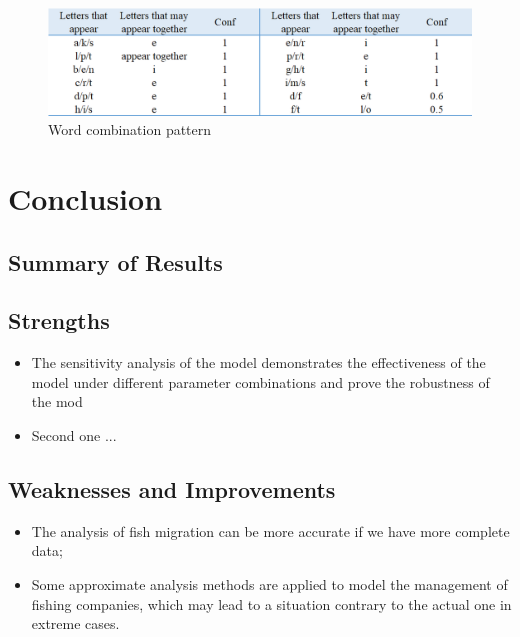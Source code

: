 \documentclass[12pt]{ctexart}
\begin{document}
\begin{figure}[htbp]
	\includegraphics[height=8\baselineskip, width=\textwidth]{1706065292593(1).jpg}
	\caption{Word combination pattern}
	\label{fg:10}
\end{figure}
  
  
  

  

\section{Conclusion}
\subsection{Summary of Results}

\subsection{Strengths}%
\begin{itemize}
	\item The sensitivity analysis of the model demonstrates the effectiveness of the model under different parameter combinations and prove the robustness of the mod
	\item Second one ...
\end{itemize}

\subsection{Weaknesses and Improvements}%
\begin{itemize}
	\item The analysis of fish migration can be more accurate if we have more complete data;
	\item Some approximate analysis methods are applied to model the management of fishing
	      companies, which may lead to a situation contrary to the actual one  in extreme cases.
\end{itemize}
\end{document}
